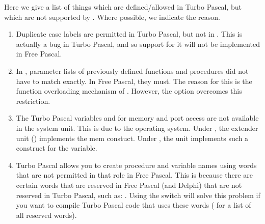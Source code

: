 Here we give a list of things which are defined/allowed in Turbo Pascal, but
which are not supported by \fpc. Where possible, we indicate the reason.
\begin{enumerate}
\item Duplicate case labels are permitted in Turbo Pascal, but not
in \fpc. This is actually a bug in Turbo Pascal, and so
support for it will not be implemented in Free Pascal.
\item In \tp, parameter lists of previously defined functions and 
procedures did not have to match exactly. In Free Pascal, they must. 
The reason for this is the function overloading mechanism of
\fpc. However, the  option overcomes this restriction.
\item The Turbo Pascal variables  and  for memory and port
access are not available in the system unit. This is due to the operating system. Under
\dos, the extender unit () implements the mem constuct.
Under \linux, the  unit implements such a construct for the
 variable.
\item Turbo Pascal allows you to create procedure and variable names
using words that are not permitted in that role in Free Pascal.
This is because there are certain words that are reserved in
Free Pascal (and Delphi) that are not reserved in Turbo Pascal, such as:
.
Using the  switch will solve this problem if
you want to compile Turbo Pascal code that uses these words
( for a list of all reserved words).


\end{enumerate}
